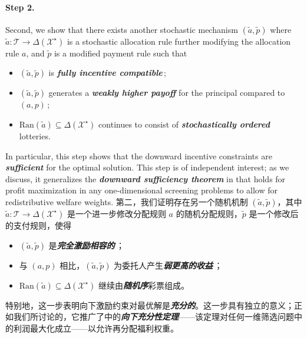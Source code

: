 \documentclass[12pt,letterpaper]{article}
\newenvironment{original}{\color{black}\noindent}{}
\newenvironment{translation}{\color{blue}\noindent}{}
\theoremstyle{plain}
\theoremstyle{definition}
\theoremstyle{remark}
\renewcommand{\1}{\mathds{1}}
\newcommand{\X}{\mathcal{X}}
\theoremstyle{definition}
\begin{document}
\paragraph{\textbf{Step 2.}}\hspace{-2mm}\begin{original}Second, we show that there exists another stochastic mechanism $(\tilde{a}, \tilde{p})$ where $\tilde{a}:\mathcal{T} \rightarrow \Delta(\X^\star)$ is a stochastic allocation rule further modifying the allocation rule $a$, and $\tilde{p}$ is a modified payment rule such that
\begin{itemize}
    \item $(\tilde{a}, \tilde{p})$ is \textit{\textbf{fully incentive compatible}}\,;
    \item $(\tilde{a}, \tilde{p})$ generates a \textit{\textbf{weakly higher payoff}} for the principal compared to $(a, p)$\,;
    \item $\text{Ran}(\tilde{a}) \subseteq \Delta(\mathcal{X}^\star)$ continues to consist of \textit{\textbf{stochastically ordered}} lotteries.
\end{itemize}
In particular, this step shows that the downward incentive constraints are \textit{\textbf{sufficient}} for the optimal solution. This step is of independent interest; as we discuss, it generalizes the \textit{\textbf{downward sufficiency theorem}} in \citet{yang2022costly} that holds for profit maximization in any one-dimensional screening problems to allow for redistributive welfare weights.
\end{original}
\begin{translation}
第二，我们证明存在另一个随机机制 $(\tilde{a}, \tilde{p})$，其中 $\tilde{a}:\mathcal{T} \rightarrow \Delta(\X^\star)$ 是一个进一步修改分配规则 $a$ 的随机分配规则，$\tilde{p}$ 是一个修改后的支付规则，使得
\begin{itemize}
    \item $(\tilde{a}, \tilde{p})$ 是\textit{\textbf{完全激励相容的}}\,；
    \item 与 $(a, p)$ 相比，$(\tilde{a}, \tilde{p})$ 为委托人产生\textit{\textbf{弱更高的收益}}\,；
    \item $\text{Ran}(\tilde{a}) \subseteq \Delta(\mathcal{X}^\star)$ 继续由\textit{\textbf{随机序}}彩票组成。
\end{itemize}
特别地，这一步表明向下激励约束对最优解是\textit{\textbf{充分的}}。这一步具有独立的意义；正如我们所讨论的，它推广了\citet{yang2022costly}中的\textit{\textbf{向下充分性定理}}——该定理对任何一维筛选问题中的利润最大化成立——以允许再分配福利权重。
\end{translation}
\end{document}
